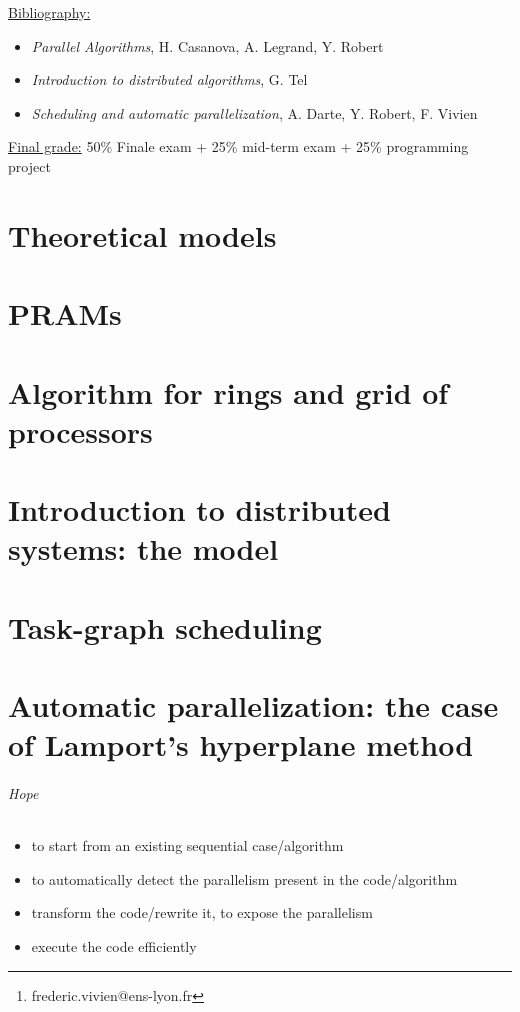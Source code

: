 \documentclass{article}
\title{}
\author{Frederic Vivien\footnote{frederic.vivien@ens-lyon.fr}\\
\small ENS de Lyon}
\date{}
\newcommand{\note}{\medskip\noindent\underline}
\begin{document}
\maketitle
\tableofcontents
\newpage


\note{Bibliography:}
\begin{itemize}
\item \textit{Parallel Algorithms}, H. Casanova, A. Legrand, Y. Robert
\item \textit{Introduction to distributed algorithms}, G. Tel
\item \textit{Scheduling and automatic parallelization}, A. Darte, Y. Robert, F. Vivien
\end{itemize}


\note{Final grade:} 50\% Finale exam + 25\% mid-term exam + 25\% programming project

\part{Theoretical models}


\newpage
\setcounter{section}{0}
\part{PRAMs}


\newpage
\setcounter{section}{0}
\part{Algorithm for rings and grid of processors}


\setcounter{section}{0}
\part{Introduction to distributed systems: the model}


\setcounter{section}{0}
\part{Task-graph scheduling}



\setcounter{section}{0}
\part{Automatic parallelization: the case of Lamport's hyperplane method}

\paragraph{Hope}
\begin{itemize}
\item to start from an existing sequential case/algorithm
\item to automatically detect the parallelism present in the code/algorithm
\item transform the code/rewrite it, to expose the parallelism
\item execute the code efficiently
\end{itemize}
\end{document}
